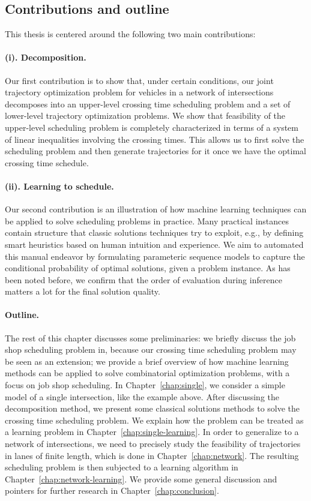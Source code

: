\documentclass[a4paper]{report}
\theoremstyle{definition}
\theoremstyle{plain}
\begin{document}
\subsection{Contributions and outline}

This thesis is centered around the following two main contributions:

\paragraph{(i). Decomposition.}
Our first contribution is to show that, under certain conditions, our joint
trajectory optimization problem for vehicles in a network of intersections
decomposes into an upper-level crossing time scheduling problem and a set of
lower-level trajectory optimization problems. We show that feasibility of the
upper-level scheduling problem is completely characterized in terms of a system
of linear inequalities involving the crossing times. This allows us to first
solve the scheduling problem and then generate trajectories for it once we have
the optimal crossing time schedule.

\paragraph{(ii). Learning to schedule.}
Our second contribution is an illustration of how machine learning techniques
can be applied to solve scheduling problems in practice.
%
Many practical instances contain structure that classic solutions techniques try
to exploit, e.g., by defining smart heuristics based on human intuition and
experience.
%
We aim to automated this manual endeavor by formulating parameteric sequence
models to capture the conditional probability of optimal solutions, given a
problem instance.
%
As has been noted before, we confirm that the order of evaluation during
inference matters a lot for the final solution quality.

\paragraph{Outline.}

The rest of this chapter discusses some preliminaries: we briefly discuss the
job shop scheduling problem in, because our crossing time scheduling problem may
be seen as an extension; we provide a brief overview of how machine learning
methods can be applied to solve combinatorial optimization problems, with a
focus on job shop scheduling.
%
In Chapter~\ref{chap:single}, we consider a simple model of a single
intersection, like the example above. After discussing the decomposition method,
we present some classical solutions methods to solve the crossing time
scheduling problem.
%
We explain how the problem can be treated as a learning problem in
Chapter~\ref{chap:single-learning}.
%
In order to generalize to a network of intersections, we need to precisely study
the feasibility of trajectories in lanes of finite length, which is done in
Chapter~\ref{chap:network}.
%
The resulting scheduling problem is then subjected to a learning algorithm in
Chapter~\ref{chap:network-learning}.
%
We provide some general discussion and pointers for further research in
Chapter~\ref{chap:conclusion}.
\end{document}
